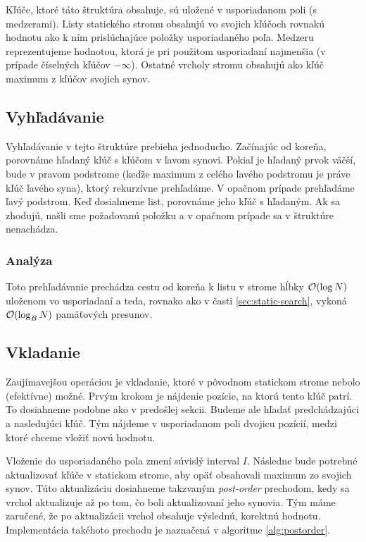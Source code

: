 Kľúče, ktoré táto štruktúra obsahuje, sú uložené v usporiadanom poli (s medzerami). Listy statického stromu obsahujú vo svojich kľúčoch rovnakú hodnotu ako k ním prislúchajúce položky usporiadaného poľa. Medzeru reprezentujeme hodnotou, ktorá je pri použitom usporiadaní najmenšia (v prípade číselných kľúčov $-\infty$). Ostatné vrcholy stromu obsahujú ako kľúč maximum z kľúčov svojich synov.

\subsection{Vyhľadávanie} \label{sec:dynamic-obliv-search}
Vyhľadávanie v tejto štruktúre prebieha jednoducho. Začínajúc od koreňa, porovnáme hľadaný kľúč s kľúčom v ľavom synovi. Pokiaľ je hľadaný prvok väčší, bude v pravom podstrome (keďže maximum z celého ľavého podstromu je práve kľúč ľavého syna), ktorý rekurzívne prehľadáme. V opačnom prípade prehľadáme ľavý podstrom. Keď dosiahneme list, porovnáme jeho kľúč s hľadaným. Ak sa zhodujú, našli sme požadovanú položku a v opačnom prípade sa v štruktúre nenachádza.

\subsubsection{Analýza}

Toto prehľadávanie prechádza cestu od koreňa k listu v strome hĺbky $\mathcal{O}(\log{N})$ uloženom vo  usporiadaní a teda, rovnako ako v časti \ref{sec:static-search}, vykoná $\mathcal{O}(\log_B{N})$ pamäťových presunov.

\subsection{Vkladanie}
Zaujímavejšou operáciou je vkladanie, ktoré v pôvodnom statickom strome nebolo (efektívne) možné. Prvým krokom je nájdenie pozície, na ktorú tento kľúč patrí. To dosiahneme podobne ako v predošlej sekcii. Budeme ale hľadať predchádzajúci a nasledujúci kľúč. Tým nájdeme v usporiadanom poli dvojicu pozícií, medzi ktoré chceme vložiť novú hodnotu.

Vloženie do usporiadaného pola zmení súvislý interval $I$. Následne bude potrebné aktualizovať kľúče v statickom strome, aby opäť obsahovali maximum zo svojich synov. Túto aktualizáciu dosiahneme takzvaným \emph{post-order} prechodom, kedy sa vrchol aktualizuje až po tom, čo boli aktualizovaní jeho synovia. Tým máme zaručené, že po aktualizácii vrchol obsahuje výslednú, korektnú hodnotu. Implementácia takéhoto prechodu je naznačená v algoritme \ref{alg:postorder}.

